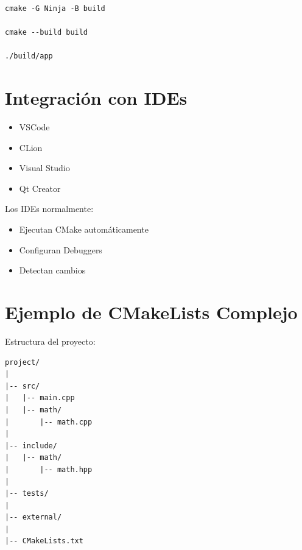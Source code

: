 \documentclass[a4paper,11pt]{article}
\begin{document}
\begin{lstlisting}
cmake -G Ninja -B build

cmake --build build

./build/app
\end{lstlisting}


\section*{Integración con IDEs}

\begin{itemize}
    \item VSCode
    \item CLion
    \item Visual Studio
    \item Qt Creator
\end{itemize}

Los IDEs normalmente:
\begin{itemize}
    \item Ejecutan CMake automáticamente
    \item Configuran Debuggers
    \item Detectan cambios
\end{itemize}



\section*{Ejemplo de CMakeLists Complejo}

Estructura del proyecto:

\begin{lstlisting}
project/
|
|-- src/
|   |-- main.cpp
|   |-- math/
|       |-- math.cpp
|
|-- include/
|   |-- math/
|       |-- math.hpp
|
|-- tests/
|
|-- external/
|
|-- CMakeLists.txt
\end{lstlisting}

\end{document}
